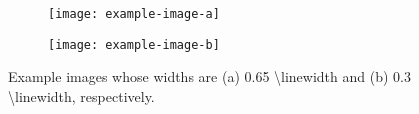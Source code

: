 \documentclass[./main]{subfiles}
\begin{document}
\begin{figure}[b]
  \centering
  \begin{subfigure}{0.65\linewidth}
    \centering
    \texttt{[image: example-image-a]}
    \captionsetup{skip=0em}
    \subcaption{}
    \label{fig:example-image-a}
  \end{subfigure}
  \begin{subfigure}{0.3\linewidth}
    \centering
    \texttt{[image: example-image-b]}
    \captionsetup{skip=0em}
    \subcaption{}
    \label{fig:example-image-b}
  \end{subfigure}
  \captionsetup{skip=-2pt}
  \caption[short caption.]{
    Example images whose widths are (a) 0.65 \textbackslash linewidth and (b) 0.3 \textbackslash linewidth, respectively. 
  }
  \label{fig:2-1}
\end{figure}


\ifSubfilesClassLoaded{%
  \printbibliography
}%
\end{document}
